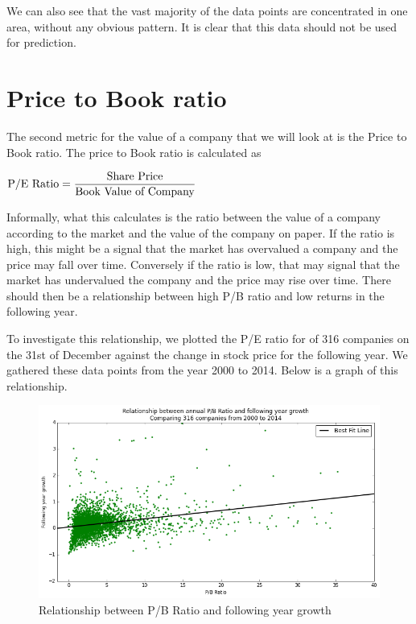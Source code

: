 \documentclass{report}
\begin{document}
We can also see that the vast majority of the data points are concentrated in one area, without any obvious pattern. It is clear that this data should not be used for prediction.

\section{Price to Book ratio}

The second metric for the value of a company that we will look at is the Price to Book ratio. The price to Book ratio is calculated as

\begin{math}
  \\
	\text{P/E Ratio} = \dfrac{\text{Share Price}}{\text{Book Value of Company}}
	\\
\end{math}

Informally, what this calculates is the ratio between the value of a company according to the market and the value of the company on paper. If the ratio is high, this might be a signal that the market has overvalued a company and the price may fall over time. Conversely if the ratio is low, that may signal that the market has undervalued the company and the price may rise over time. There should then be a relationship between high P/B ratio and low returns in the following year. 

To investigate this relationship, we plotted the P/E ratio for of 316 companies on the 31st of December against the change in stock price for the following year. We gathered these data points from the year 2000 to 2014. Below is a graph of this relationship.

\begin{figure}[H]
	\caption{Relationship between P/B Ratio and following year growth}
	\centerline{\includegraphics[width=\textwidth]{vis/pb-ratio-abs.png}}
	\label{fig:pb-abs}
\end{figure}
\end{document}
